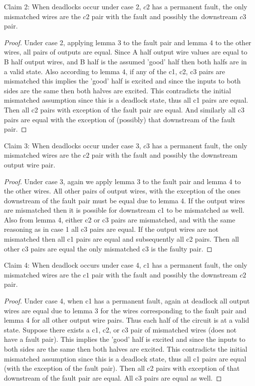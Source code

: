 \documentclass{article}
\begin{document}
Claim 2: When deadlocks occur under case 2, $c2$ has a permanent fault, the only mismatched wires are the $c2$ pair with the fault and possibly the downstream $c3$ pair.
\begin{proof}
Under case 2, applying lemma 3 to the fault pair and lemma 4 to the other wires, all pairs of outputs are equal.  Since A half output wire values are equal to B half output wires, and B half is the assumed 'good' half then both halfs are in a valid state.  Also according to lemma 4, if any of the c1, c2, c3 pairs are mismatched this implies the 'good' half is excited and since the inputs to both sides are the same then both halves are excited.  This contradicts the initial mismatched assumption since this is a deadlock state, thus all c1 pairs are equal.  Then all c2 pairs with exception of the fault pair are equal.  And similarly all c3 pairs are equal with the exception of (possibly) that downstream of the fault pair. \newline
\end{proof}
Claim 3:  When deadlocks occur under case 3, $c3$ has a permanent fault, the only mismatched wires are the $c2$ pair with the fault and possibly the downstream output wire pair.
\begin{proof}
Under case 3, again we apply lemma 3 to the fault pair and lemma 4 to the other wires.  All other pairs of output wires, with the exception of the ones downstream of the fault pair must be equal due to lemma 4.  If the output wires are mismatched then it is possible for downstream c1 to be mismatched as well.  Also from lemma 4, either c2 or c3 pairs are mismatched, and with the same reasoning as in case 1 all c3 pairs are equal.  If the output wires are not mismatched then all c1 pairs are equal and subsequently all c2 pairs.  Then all other c3 pairs are equal the only mismatched c3 is the faulty pair. \newline
\end{proof}
Claim 4:  When deadlock occurs under case 4, $c1$ has a permanent fault, the only mismatched wires are the $c1$ pair with the fault and possibly the downstream $c2$ pair.
\begin{proof}
Under case 4, when c1 has a permanent fault, again at deadlock all output wires are equal due to lemma 3 for the wires corresponding to the fault pair and lemma 4 for all other output wire pairs.  Thus each half of the circuit is at a valid state.  Suppose there exists a c1, c2, or c3 pair of mismatched wires (does not have a fault pair).  This implies the 'good' half is excited and since the inputs to both sides are the same then both halves are excited.  This contradicts the initial mismatched assumption since this is a deadlock state, thus all c1 pairs are equal (with the exception of the fault pair).  Then all c2 pairs with exception of that downstream of the fault pair are equal.  All c3 pairs are equal as well. \newline
\end{proof}
\end{document}
